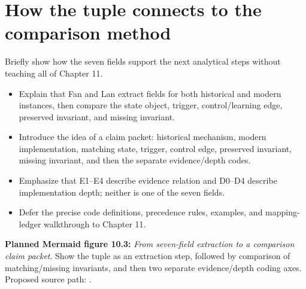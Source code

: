 \section{How the tuple connects to the comparison method}
Briefly show how the seven fields support the next analytical steps without teaching all of Chapter 11.
\begin{itemize}
  \item Explain that Fan and Lan extract fields for both historical and modern instances, then compare the state object, trigger, control/learning edge, preserved invariant, and missing invariant.
  \item Introduce the idea of a claim packet: historical mechanism, modern implementation, matching state, trigger, control edge, preserved invariant, missing invariant, and then the separate evidence/depth codes.
  \item Emphasize that E1--E4 describe evidence relation and D0--D4 describe implementation depth; neither is one of the seven fields.
  \item Defer the precise code definitions, precedence rules, examples, and mapping-ledger walkthrough to Chapter 11.
\end{itemize}
\textbf{Planned Mermaid figure 10.3:} \emph{From seven-field extraction to a comparison claim packet}. Show the tuple as an extraction step, followed by comparison of matching/missing invariants, and then two separate evidence/depth coding axes. Proposed source path: .


